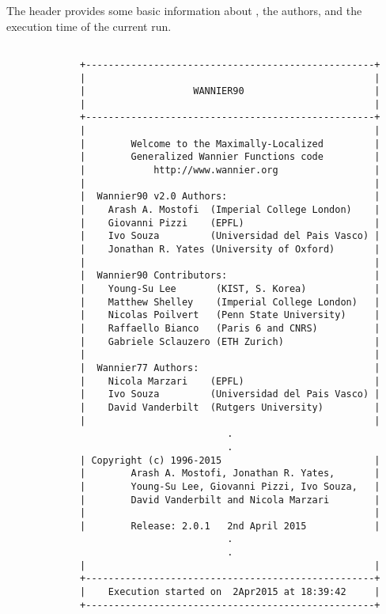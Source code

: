 The header provides some basic information about \wannier, the
authors, and the execution time of the current run.

\begin{verbatim}

             +---------------------------------------------------+
             |                                                   |
             |                   WANNIER90                       |
             |                                                   |
             +---------------------------------------------------+
             |                                                   |
             |        Welcome to the Maximally-Localized         |
             |        Generalized Wannier Functions code         |
             |            http://www.wannier.org                 |
             |                                                   |
             |  Wannier90 v2.0 Authors:                          |
             |    Arash A. Mostofi  (Imperial College London)    |
             |    Giovanni Pizzi    (EPFL)                       |
             |    Ivo Souza         (Universidad del Pais Vasco) |
             |    Jonathan R. Yates (University of Oxford)       |
             |                                                   |
             |  Wannier90 Contributors:                          |
             |    Young-Su Lee       (KIST, S. Korea)            |
             |    Matthew Shelley    (Imperial College London)   |
             |    Nicolas Poilvert   (Penn State University)     |
             |    Raffaello Bianco   (Paris 6 and CNRS)          |
             |    Gabriele Sclauzero (ETH Zurich)                |
             |                                                   |
             |  Wannier77 Authors:                               |
             |    Nicola Marzari    (EPFL)                       |
             |    Ivo Souza         (Universidad del Pais Vasco) |
             |    David Vanderbilt  (Rutgers University)         |
             |                                                   |
                                       .
                                       .
             | Copyright (c) 1996-2015                           |
             |        Arash A. Mostofi, Jonathan R. Yates,       |
             |        Young-Su Lee, Giovanni Pizzi, Ivo Souza,   |
             |        David Vanderbilt and Nicola Marzari        |
             |                                                   |
             |        Release: 2.0.1   2nd April 2015            |
                                       .
                                       .
             |                                                   |
             +---------------------------------------------------+
             |    Execution started on  2Apr2015 at 18:39:42     |
             +---------------------------------------------------+

\end{verbatim}

